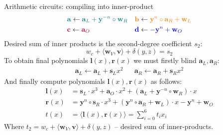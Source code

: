\documentclass{zkdl-presentation-template}
\begin{document}
\begin{frame}{Arithmetic circuits: compiling into inner-product}
    \vspace{-1em}
    \begin{equation*}
        \begin{aligned}
            &\textcolor{teal}{\mathbf{a}} \gets \textcolor{teal}{\mathbf{a}_L + \mathbf{y}^{-n} \circ \mathbf{w}_R} &&\textcolor{orange}{\mathbf{b}} \gets \textcolor{orange}{\mathbf{y}^n \circ \mathbf{a}_R + \mathbf{w}_L} \\
            &\textcolor{purple}{\mathbf{c}} \gets \textcolor{purple}{\mathbf{a}_O} &&\textcolor{blue}{\mathbf{d}} \gets \textcolor{blue}{-\mathbf{y}^n + \mathbf{w}_O}
        \end{aligned}
    \end{equation*}
    Desired sum of inner products is the second-degree coefficient $s_2$:
    $$ w_c + \langle \mathbf{w}_V, \mathbf{v} \rangle + \delta(y, z) = s_2$$
    To obtain final polynomials $\mathbf{l}(x), \mathbf{r}(x)$ we must firstly blind $\mathbf{a}_L, \mathbf{a}_R$:
    \begin{equation*}
        \begin{aligned}
        \mathbf{a}_L \gets \mathbf{a}_L + \mathbf{s}_Lx^2 && \mathbf{a}_R \gets \mathbf{a}_R + \mathbf{s}_Rx^2
        \end{aligned}
    \end{equation*}
    And finally compute polynomials $\mathbf{l}(x), \mathbf{r}(x)$ as follows:
    \begin{equation*}
        \begin{aligned}
            {\mathbf{l}}(x) &= \mathbf{s}_L \cdot x^3 + \mathbf{a}_O \cdot x^2 + (\mathbf{a}_L + \mathbf{y}^{-n} \circ \mathbf{w}_R) \cdot x \\
            {\mathbf{r}}(x) &= \mathbf{y}^n \circ \mathbf{s}_R \cdot x^3 + (\mathbf{y}^n \circ \mathbf{a}_R +  \mathbf{w}_L) \cdot x - \mathbf{y}^n + \mathbf{w}_O \\
            t(x) &= \langle \mathbf{l}(x), \mathbf{r}(x) \rangle = \sum_{i=0}^6 t_i x_i
        \end{aligned}
    \end{equation*}
    Where $t_2 = w_c + \langle \mathbf{w}_V, \mathbf{v} \rangle + \delta(y, z)$ -- desired sum of inner-products.
\end{frame}
\end{document}
